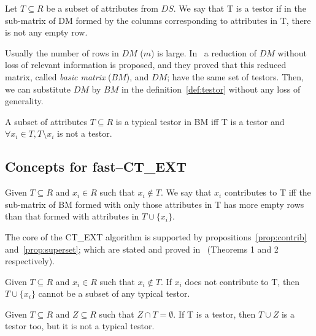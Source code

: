 \documentclass[citenumber]{llncs}
\begin{document}
	\begin{definition}\label{def:testor}
		Let $T \subseteq R$ be a subset of attributes from $DS$. We say that T is a testor if in the sub-matrix
		of DM formed by the columns corresponding to attributes in T, there is not any empty row.
	\end{definition} 	
	
	Usually the number of rows in $DM$ ($m$) is large. In~\cite{Lazo2001} a reduction of $DM$ without loss of relevant information is proposed, and they proved that this reduced matrix, called \textit{basic matrix} ($BM$), and $DM$; have the same set of testors. Then, we can substitute $DM$ by $BM$ in the definition~\ref{def:testor} without any loss of generality. 	
	
	\begin{definition}\label{def:TT}
		A subset of attributes $T \subseteq R$ is a typical testor in BM iff T is a testor and $\forall x_i \in T, T \setminus x_i$ is not a testor. 
	\end{definition}
		
%	
\subsection{Concepts for fast--CT\_EXT}
%
		
	\begin{definition}\label{def:contrib}
		Given $T \subseteq R$ and $x_i \in R$ such that $x_i \notin T$. We say that $x_i$ contributes to T iff the sub-matrix of BM formed with only those attributes in T has more empty rows than that formed with attributes in $T \cup \lbrace x_i \rbrace$.
	\end{definition}	
	
	The core of the CT\_EXT algorithm is supported by propositions~\ref{prop:contrib} and~\ref{prop:superset}; which are stated and proved in~\cite{Sanchez2010} (Theorems 1 and 2 respectively).
	
	\begin{proposition}\label{prop:contrib} 
		Given $T \subseteq R$ and  $x_i \in R$ such that $x_i \notin T$. If $x_i$ does not contribute to T, then 		$T\cup\{x_i\}$ cannot be a subset of any typical testor.
	\end{proposition}

	\begin{proposition}\label{prop:superset} 
		Given $T \subseteq R$ and $Z \subseteq R$ such that $Z \cap T = \emptyset$. If T is a testor, then $T \cup Z$ is a 	testor too, but it is not a typical testor.
	\end{proposition}
\end{document}
